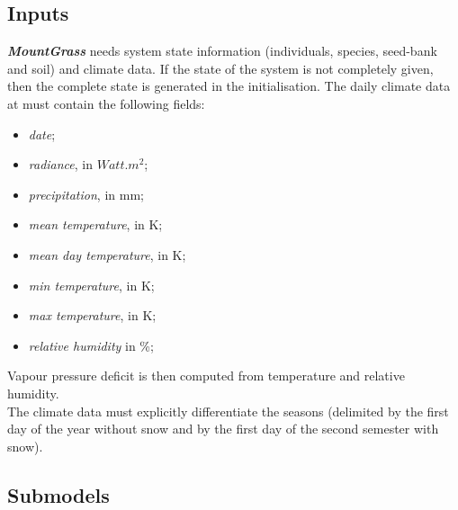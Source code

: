 \documentclass[a4paper,twoside, justified,marginals=raggedright]{tufte-handout}
\newcommand{\model}{\textit{\textbf{MountGrass }}}
\begin{document}
\subsection{Inputs}
\model needs system state information (individuals, species, seed-bank and soil) and climate data. If the state of the system is not completely given, then the complete state is generated in the initialisation. The daily climate data at must contain the following fields:
\begin{itemize}
\setlength\itemsep{0em}
\item \textit{date};
\item \textit{radiance}, in $Watt.m^{2}$;
\item \textit{precipitation}, in mm;
\item \textit{mean temperature}, in K;
\item \textit{mean day temperature}, in K;
\item \textit{min temperature}, in K;
\item \textit{max temperature}, in K;
\item \textit{relative humidity} in \%;
\end{itemize}
Vapour pressure deficit is then computed from temperature and relative humidity.\\
\indent The climate data must explicitly differentiate the seasons (delimited by the first day of the year without snow and by the first day of the second semester with snow).

\subsection{Submodels}
\end{document}
